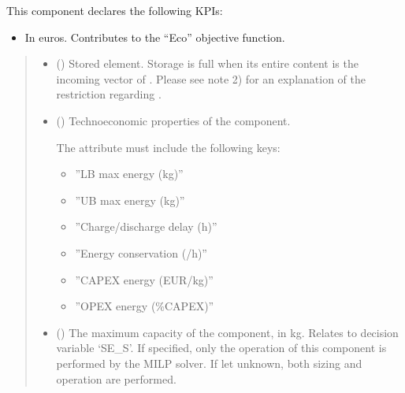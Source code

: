 \documentclass[letterpaper,10pt,english]{sphinxmanual}
\begin{document}
\begin{fulllineitems}
\begin{fulllineitems}
\begin{itemize}
\end{itemize}

\sphinxAtStartPar
This component declares the following KPIs:
\begin{itemize}
\item {} 
\sphinxAtStartPar
{}
In euros.
Contributes to the “Eco” objective function.

\end{itemize}
\begin{quote}\begin{description}
\begin{itemize}
\item {} 
\sphinxAtStartPar
{} () \textendash{} Stored element.
Storage is full when its entire content is the incoming vector of .
Please see note 2) for an explanation of the restriction regarding .

\item {} 
\sphinxAtStartPar
{} (\sphinxstyleliteralemphasis{\sphinxupquote{ | }}) \textendash{} 
\sphinxAtStartPar
Techno\sphinxhyphen{}economic properties of the component.

\sphinxAtStartPar
The  attribute must include the following keys:
\begin{itemize}
\item {} 
\sphinxAtStartPar
”LB max energy (kg)”

\item {} 
\sphinxAtStartPar
”UB max energy (kg)”

\item {} 
\sphinxAtStartPar
”Charge/discharge delay (h)”

\item {} 
\sphinxAtStartPar
”Energy conservation (/h)”

\item {} 
\sphinxAtStartPar
”CAPEX energy (EUR/kg)”

\item {} 
\sphinxAtStartPar
”OPEX energy (\%CAPEX)”

\end{itemize}


\item {} 
\sphinxAtStartPar
{} (\sphinxstyleliteralemphasis{\sphinxupquote{, }}) \textendash{} The maximum capacity of the component, in kg.
Relates to decision variable ‘SE\_S’.
If specified, only the operation of this component is performed by the MILP solver.
If let unknown, both sizing and operation are performed.


\end{itemize}
\end{description}
\end{quote}
\end{fulllineitems}
\end{fulllineitems}
\end{document}
